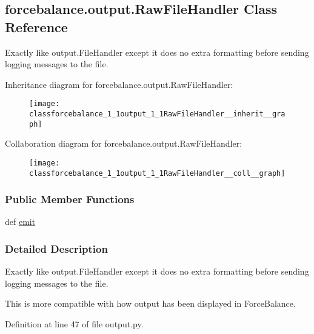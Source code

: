 \hypertarget{classforcebalance_1_1output_1_1RawFileHandler}{\subsection{forcebalance.\-output.\-Raw\-File\-Handler Class Reference}
\label{classforcebalance_1_1output_1_1RawFileHandler}
}


Exactly like output.\-File\-Handler except it does no extra formatting before sending logging messages to the file.  




Inheritance diagram for forcebalance.\-output.\-Raw\-File\-Handler\-:
\nopagebreak
\begin{figure}[H]
\begin{center}
\leavevmode
\texttt{[image: classforcebalance\_1\_1output\_1\_1RawFileHandler\_\_inherit\_\_graph]}
\end{center}
\end{figure}


Collaboration diagram for forcebalance.\-output.\-Raw\-File\-Handler\-:
\nopagebreak
\begin{figure}[H]
\begin{center}
\leavevmode
\texttt{[image: classforcebalance\_1\_1output\_1\_1RawFileHandler\_\_coll\_\_graph]}
\end{center}
\end{figure}
\subsubsection*{Public Member Functions}
\begin{DoxyCompactItemize}
\item 
def \hyperlink{classforcebalance_1_1output_1_1RawFileHandler_a55d391dbd042a51aa1d15106151eecd3}{emit}
\end{DoxyCompactItemize}


\subsubsection{Detailed Description}
Exactly like output.\-File\-Handler except it does no extra formatting before sending logging messages to the file. 

This is more compatible with how output has been displayed in Force\-Balance. 

Definition at line 47 of file output.\-py.



